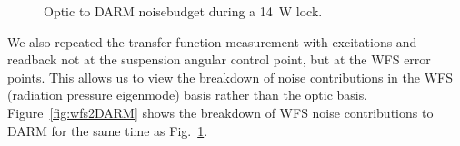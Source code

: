 \begin{figure}
\begin{centering}
\caption[Optic to DARM noisebudget]{Optic to DARM noisebudget during a
  14~W lock.}%
\label{fig:optic2DARM}
\end{centering}
\end{figure}

We also repeated the transfer function measurement with excitations
and readback not at the suspension angular control point, but at the
WFS error points. This allows us to view the breakdown of noise
contributions in the WFS (radiation pressure eigenmode) basis rather
than the optic basis. Figure~\ref{fig:wfs2DARM} shows the breakdown of
WFS noise contributions to DARM for the same time as
Fig.~\ref{fig:optic2DARM}.

